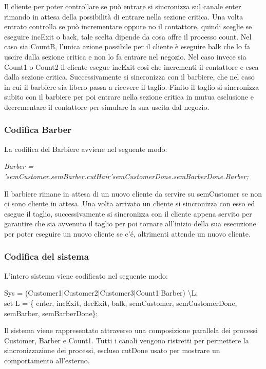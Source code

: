 Il cliente per poter controllare se può entrare si sincronizza sul canale enter rimando in attesa della possibilità di entrare nella sezione critica. Una volta entrato controlla se può incrementare oppure no il contattore, quindi sceglie se eseguire incExit o back, tale scelta dipende da cosa offre il processo count. Nel caso sia CountB, l'unica azione possibile per il cliente è eseguire balk che lo fa uscire dalla sezione critica e non lo fa entrare nel negozio. Nel caso invece sia Count1 o Count2 il cliente esegue incExit cosi che incrementi il contattore e esca dalla sezione critica. Successivamente si sincronizza con il barbiere, che nel caso in cui il barbiere sia libero passa a ricevere il taglio. Finito il taglio si sincronizza subito con il barbiere per poi entrare nella sezione critica in mutua esclusione e decrementare il contattore per simulare la sua uscita dal negozio.

\subsubsection{Codifica Barber}

La codifica del Barbiere avviene nel seguente modo:

\emph{Barber = 'semCustomer.semBarber.cutHair'semCustomerDone.semBarberDone.Barber;}

Il barbiere rimane in attesa di un nuovo cliente da servire su semCustomer se non ci sono cliente in attesa. Una volta arrivato un cliente si sincronizza con esso ed esegue il taglio, successivamente si sincronizza con il cliente appena servito per garantire che sia avvenuto il taglio per poi tornare all'inizio della sua esecuzione per poter eseguire un nuovo cliente se c'é, altrimenti attende un nuovo cliente.

\subsubsection{Codifica del sistema}

L'intero sistema viene codificato nel seguente modo:

Sys = (Customer1|Customer2|Customer3|Count1|Barber) \textbackslash L;\\
set L = \{ enter, incExit, decExit, balk, semCustomer, semCustomerDone, semBarber, semBarberDone\};

Il sistema viene rappresentato attraverso una composizione parallela dei processi Customer, Barber e Count1. Tutti i canali vengono ristretti per permettere la sincronizzazione dei processi, escluso cutDone usato per mostrare un comportamento all'esterno.

